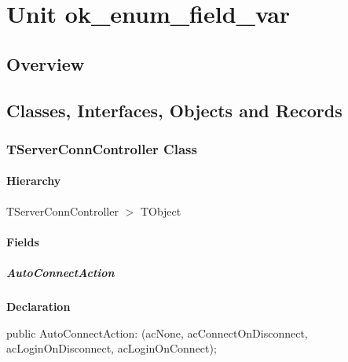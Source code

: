 \documentclass{report}
\begin{document}
\newlength{\tmplength}
\chapter{Unit ok{\_}enum{\_}field{\_}var}
\section{Overview}
\begin{description}
\item[\texttt{\begin{ttfamily}TServerConnController\end{ttfamily} Class}]
\end{description}
\section{Classes, Interfaces, Objects and Records}
\subsection*{TServerConnController Class}
\subsubsection*{\large{\textbf{Hierarchy}}\normalsize\hspace{1ex}\hfill}
TServerConnController {$>$} TObject
\subsubsection*{\large{\textbf{Fields}}\normalsize\hspace{1ex}\hfill}
\paragraph*{AutoConnectAction}\hspace*{\fill}

\begin{list}{}{
\setlength{\itemindent}{0cm}
\setlength{\listparindent}{0cm}
\setlength{\leftmargin}{\evensidemargin}
\addtolength{\leftmargin}{\tmplength}
\settowidth{\labelsep}{X}
\addtolength{\leftmargin}{\labelsep}
\setlength{\labelwidth}{\tmplength}
}
\begin{flushleft}
\item[\textbf{Declaration}\hfill]
\begin{ttfamily}
public AutoConnectAction: (acNone,
                        acConnectOnDisconnect,
                        acLoginOnDisconnect,
                        acLoginOnConnect);\end{ttfamily}


\end{flushleft}
\end{list}
\end{document}
